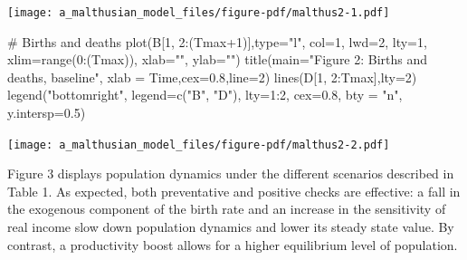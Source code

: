 \documentclass[
  letterpaper,
  DIV=11,
  numbers=noendperiod]{scrreprt}
\newenvironment{Shaded}{\begin{snugshade}}{\end{snugshade}}
\newcommand{\AttributeTok}[1]{\textcolor[rgb]{0.40,0.45,0.13}{#1}}
\newcommand{\CommentTok}[1]{\textcolor[rgb]{0.37,0.37,0.37}{#1}}
\newcommand{\DecValTok}[1]{\textcolor[rgb]{0.68,0.00,0.00}{#1}}
\newcommand{\FloatTok}[1]{\textcolor[rgb]{0.68,0.00,0.00}{#1}}
\newcommand{\FunctionTok}[1]{\textcolor[rgb]{0.28,0.35,0.67}{#1}}
\newcommand{\NormalTok}[1]{\textcolor[rgb]{0.00,0.23,0.31}{#1}}
\newcommand{\SpecialCharTok}[1]{\textcolor[rgb]{0.37,0.37,0.37}{#1}}
\newcommand{\StringTok}[1]{\textcolor[rgb]{0.13,0.47,0.30}{#1}}
\begin{document}
\texttt{[image: a\_malthusian\_model\_files/figure-pdf/malthus2-1.pdf]}

\begin{Shaded}
\begin{Highlighting}[]

\CommentTok{\# Births and deaths}
\FunctionTok{plot}\NormalTok{(B[}\DecValTok{1}\NormalTok{, }\DecValTok{2}\SpecialCharTok{:}\NormalTok{(Tmax}\SpecialCharTok{+}\DecValTok{1}\NormalTok{)],}\AttributeTok{type=}\StringTok{"l"}\NormalTok{, }\AttributeTok{col=}\DecValTok{1}\NormalTok{, }\AttributeTok{lwd=}\DecValTok{2}\NormalTok{, }\AttributeTok{lty=}\DecValTok{1}\NormalTok{, }\AttributeTok{xlim=}\FunctionTok{range}\NormalTok{(}\DecValTok{0}\SpecialCharTok{:}\NormalTok{(Tmax)), }\AttributeTok{xlab=}\StringTok{""}\NormalTok{, }\AttributeTok{ylab=}\StringTok{""}\NormalTok{) }
\FunctionTok{title}\NormalTok{(}\AttributeTok{main=}\StringTok{"Figure 2: Births and deaths, baseline"}\NormalTok{, }\AttributeTok{xlab =} \StringTok{\textquotesingle{}Time\textquotesingle{}}\NormalTok{,}\AttributeTok{cex=}\FloatTok{0.8}\NormalTok{,}\AttributeTok{line=}\DecValTok{2}\NormalTok{)}
\FunctionTok{lines}\NormalTok{(D[}\DecValTok{1}\NormalTok{, }\DecValTok{2}\SpecialCharTok{:}\NormalTok{Tmax],}\AttributeTok{lty=}\DecValTok{2}\NormalTok{)}
\FunctionTok{legend}\NormalTok{(}\StringTok{"bottomright"}\NormalTok{, }\AttributeTok{legend=}\FunctionTok{c}\NormalTok{(}\StringTok{"B"}\NormalTok{, }\StringTok{"D"}\NormalTok{),}
       \AttributeTok{lty=}\DecValTok{1}\SpecialCharTok{:}\DecValTok{2}\NormalTok{, }\AttributeTok{cex=}\FloatTok{0.8}\NormalTok{, }\AttributeTok{bty =} \StringTok{"n"}\NormalTok{, }\AttributeTok{y.intersp=}\FloatTok{0.5}\NormalTok{)}
\end{Highlighting}
\end{Shaded}

\texttt{[image: a\_malthusian\_model\_files/figure-pdf/malthus2-2.pdf]}

Figure 3 displays population dynamics under the different scenarios
described in Table 1. As expected, both preventative and positive checks
are effective: a fall in the exogenous component of the birth rate and
an increase in the sensitivity of real income slow down population
dynamics and lower its steady state value. By contrast, a productivity
boost allows for a higher equilibrium level of population.
\end{document}
